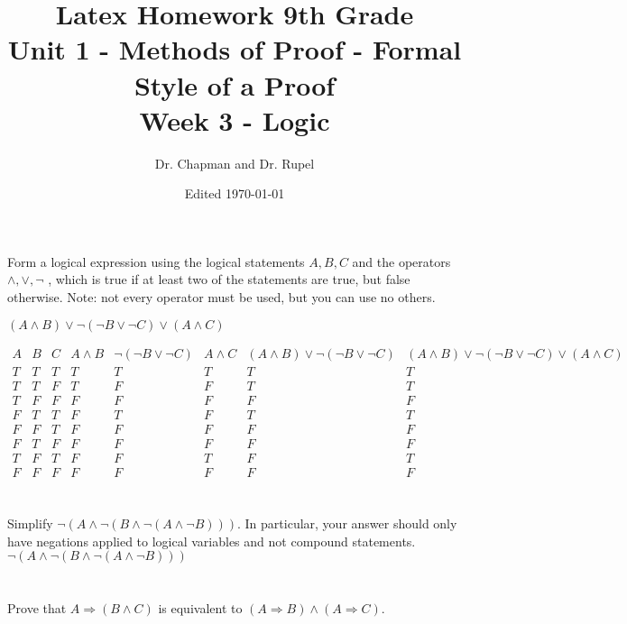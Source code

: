 \documentclass{article}
\title{Latex Homework 9th Grade\\ Unit 1 - Methods of Proof - Formal Style of a Proof\\ Week 3 - Logic}
\author{Dr. Chapman and Dr. Rupel}
\date{Edited \today}
\begin{document}
\maketitle

\section{}
    Form a logical expression using the logical statements \(A,B,C\) and the operators \(\wedge,\vee,\neg\) , which is true if at least two of the statements are true, but false otherwise. Note: not every operator must be used, but you can use no others.

$(A\land B)\lor\neg(\neg B \lor \neg C)\lor(A \land C)$


$\begin{array}{c|c|c|c|c|c|c|c}A&B&C& A\land B& \neg(\neg B\lor \neg C)&A\land C&(A\land B)\lor\neg(\neg B\lor\neg C)&(A\land B)\lor\neg(\neg B\lor\neg C)\lor(A\land C)\\
\hline T&T&T&T&T&T&T&T \\ \hline T&T&F&T&F&F&T&T \\ \hline T&F&F&F&F&F&F&F \\ \hline F&T&T&F&T&F&T&T \\ \hline F&F&T&F&F&F&F&F
\\ \hline F&T&F&F&F&F&F&F \\ \hline T&F&T&F&F&T&F&T \\ \hline F&F&F&F&F&F&F&F
\end{array}$


\section{}
    Simplify \(\neg(A\wedge\neg(B\wedge\neg(A\wedge\neg B)))\). In particular, your answer should only have negations applied to logical variables and not compound statements.
\\    
    \(\neg(A\wedge\neg(B\wedge\neg(A\wedge\neg B)))\)
    \equiv
\section{}
    Prove that \(A\Rightarrow(B\wedge C)\) is equivalent to \((A\Rightarrow B)\wedge(A\Rightarrow C)\).
    
\end{document}
